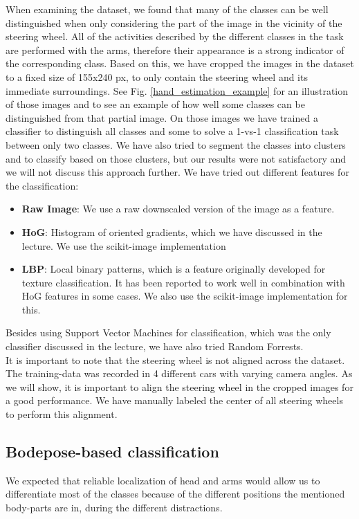 \documentclass[10pt,twocolumn,letterpaper]{article}
\begin{document}
When examining the dataset, we found that many of the classes can be well distinguished when only considering the part of the image in the vicinity of the steering wheel. All of the activities described by the different classes in the task are performed with the arms, therefore their appearance is a strong indicator of the corresponding class. Based on this, we have cropped the images in the dataset to a fixed size of 155x240 px, to only contain the steering wheel and its immediate surroundings. See Fig. \ref{hand_estimation_example} for an illustration of those images and to see an example of how well some classes can be distinguished from that partial image. On those images we have trained a classifier to distinguish all classes and some to solve a 1-vs-1 classification task between only two classes. We have also tried to segment the classes into clusters and to classify based on those clusters, but our results were not satisfactory and we will not discuss this approach further. We have tried out different features for the classification:
\begin{itemize}
	\item \textbf{Raw Image}: We use a raw downscaled version of the image as a feature.
	\item \textbf{HoG}: Histogram of oriented gradients, which we have discussed in the lecture. We use the scikit-image implementation
	\item \textbf{LBP}: Local binary patterns, which is a feature originally developed for texture classification. It has been reported to work well in combination with HoG features in some cases. We also use the scikit-image implementation for this.
\end{itemize}
Besides using Support Vector Machines for classification, which was the only classifier discussed in the lecture, we have also tried Random Forrests.\\
It is important to note that the steering wheel is not aligned across the dataset. The training-data was recorded in 4 different cars with varying camera angles. As we will show, it is important to align the steering wheel in the cropped images for a good performance. We have manually labeled the center of all steering wheels to perform this alignment.



\subsection{Bodepose-based classification}
We expected that reliable localization of head and arms would allow us to differentiate most of the classes because of the different positions the mentioned body-parts are in, during the different distractions.
\end{document}
